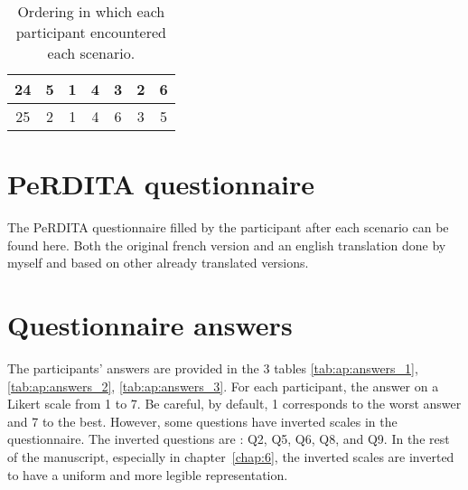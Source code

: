 \begin{table}[]
\begin{tabular}{|c|c|c|c|c|c|c|}
    24                                                       & 5                                                 & 1                                                 & 4                                                 & 3                                                 & 2                                                 & 6                                                 \\ \hline
    25                                                       & 2                                                 & 1                                                 & 4                                                 & 6                                                 & 3                                                 & 5                                                 \\ \hline
    \end{tabular}
    \caption{Ordering in which each participant encountered each scenario. }
    \label{tab:ap:ordering}
    \end{table}

\section{PeRDITA questionnaire}

The PeRDITA questionnaire filled by the participant after each scenario can be found here. Both the original french version and an english translation done by myself and based on other already translated versions. 


\section{Questionnaire answers}

The participants' answers are provided in the 3 tables \ref{tab:ap:answers_1}, \ref{tab:ap:answers_2}, \ref{tab:ap:answers_3}. For each participant, the answer on a
Likert scale from 1 to 7. Be careful, by default, 1 corresponds to the worst answer and 7 to the best. However, some questions have inverted scales in the questionnaire. The inverted questions are : Q2, Q5, Q6, Q8, and Q9. In the rest of the manuscript, especially in chapter~\ref{chap:6}, the inverted scales are inverted to have a uniform and more legible representation. 

